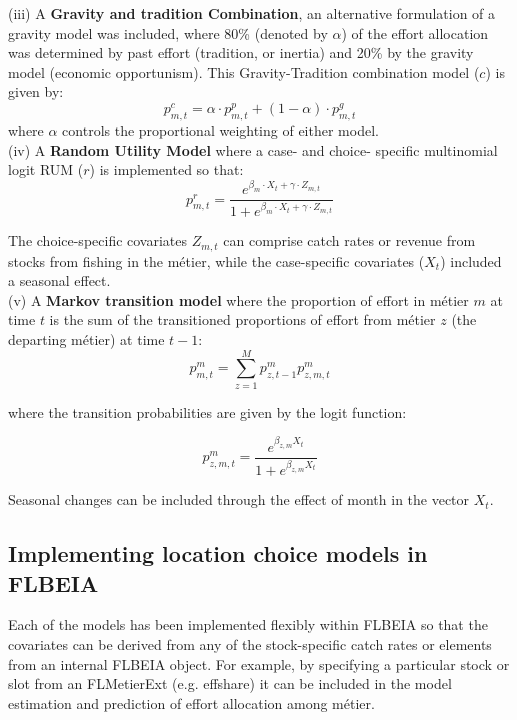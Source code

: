 \documentclass[12pt, halfline, a4paper]{ouparticle}
\begin{document}
(iii) A \textbf{Gravity and tradition Combination}, an alternative formulation
of a gravity model was included, where 80\% (denoted by $\alpha$) of the effort
allocation was determined by past effort (tradition, or inertia) and 20\% by
the gravity model (economic opportunism). This Gravity-Tradition combination
model ($c$) is given by:
\begin{equation}
	p^{c}_{m,t} = \alpha \cdot p^{p}_{m,t} + (1 - \alpha) \cdot p^{g}_{m,t}
\end{equation}
where $\alpha$ controls the proportional weighting of either model. \\ 

(iv) A \textbf{Random Utility Model} where a case- and choice- specific
multinomial logit RUM ($r$) is implemented so that:  
\begin{equation}
p^{r}_{m,t} = \frac{e^{\beta_{m} \cdot X_{t} + \gamma \cdot Z_{m,t}}}{1 + 
	e^{\beta_{m} \cdot X_{t} + \gamma \cdot Z_{m,t}}}
\label{eqn:rum}
\end{equation} 

The choice-specific covariates $Z_{m,t}$ can comprise catch rates or revenue
from stocks from fishing in the métier, while the case-specific covariates
($X_{t}$) included a seasonal effect. \\

(v) A \textbf{Markov transition model} where the proportion of effort in métier
$m$ at time $t$ is the sum of the transitioned proportions of effort from
métier $z$ (the departing métier) at time $t-1$:
\begin{equation}
p^m_{m,t} = \sum_{z = 1}^{M} p^m_{z, t-1} p^m_{z,m,t}
\end{equation}

where the transition probabilities are given by the logit function:

\begin{equation}
p^m_{z,m,t} = \frac{e^{\beta_{z,m} X_{t}}}{1+e^{\beta_{z,m} X_{t}}}
\end{equation}

Seasonal changes can be included through the effect of month in the vector
$X_t$. 

\subsection{Implementing location choice models in FLBEIA}

Each of the models has been implemented flexibly within FLBEIA so that the
covariates can be derived from any of the stock-specific catch rates or
elements from an internal FLBEIA object. For example, by specifying a
particular stock or slot from an FLMetierExt (e.g. effshare) it can be included
in the model estimation and prediction of effort allocation among métier. \\
\end{document}
